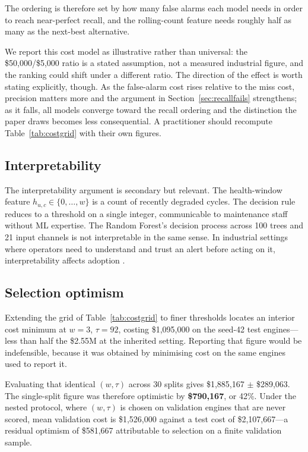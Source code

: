\documentclass[10pt,twocolumn]{article}
\begin{document}
The ordering is therefore set by how many false alarms each model needs in order to
reach near-perfect recall, and the rolling-count feature needs roughly half as many as
the next-best alternative.

We report this cost model as illustrative rather than universal: the \$50,000/\$5,000
ratio is a stated assumption, not a measured industrial figure, and the ranking could
shift under a different ratio. The direction of the effect is worth stating explicitly,
though. As the false-alarm cost rises relative to the miss cost, precision matters more
and the argument in Section~\ref{sec:recallfails} strengthens; as it falls, all models
converge toward the recall ordering and the distinction the paper draws becomes less
consequential. A practitioner should recompute Table~\ref{tab:costgrid} with their own
figures.

\subsection{Interpretability}

The interpretability argument is secondary but relevant.
The health-window feature $h_{u,c} \in \{0,\ldots,w\}$ is a count of recently degraded
cycles.
The decision rule reduces to a threshold on a single integer, communicable to
maintenance staff without ML expertise.
The Random Forest's decision process across 100 trees and 21 input channels is not
interpretable in the same sense.
In industrial settings where operators need to understand and trust an alert before
acting on it, interpretability affects adoption \cite{jardine2006review}.

\subsection{Selection optimism}
\label{sec:optimism}

Extending the grid of Table~\ref{tab:costgrid} to finer thresholds locates an interior
cost minimum at $w=3$, $\tau=92$, costing \$1,095,000 on the seed-42 test engines---less
than half the \$2.55M at the inherited setting. Reporting that figure would be
indefensible, because it was obtained by minimising cost on the same engines used to
report it.

Evaluating that identical $(w,\tau)$ across 30 splits gives \$1,885,167 $\pm$
\$289,063. The single-split figure was therefore optimistic by \textbf{\$790,167}, or
42\%. Under the nested protocol, where $(w,\tau)$ is chosen on validation engines that
are never scored, mean validation cost is \$1,526,000 against a test cost of
\$2,107,667---a residual optimism of \$581,667 attributable to selection on a finite
validation sample.
\end{document}
